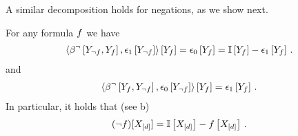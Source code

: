 A similar decomposition holds for negations, as we show next.

\begin{theorem}
    For any formula $f$ we have
    \begin{align*}
        \left\langle 
            \beta^{\lnot}\left[Y_{\lnot f},Y_{f}\right],\epsilon_{1}\left[Y_{\lnot f}\right]
        \right\rangle \left[ Y_{f} \right]
        = \epsilon_{0}\left[Y_{f}\right] =  \mathbb{I}\left[Y_{f}\right] - \epsilon_{1}\left[Y_{f}\right] \, .
    \end{align*}
    and
    \begin{align*}
        \left\langle 
            \beta^{\lnot}\left[Y_{f},Y_{\lnot f}\right],\epsilon_{0}\left[Y_{\lnot f}\right]
        \right\rangle \left[ Y_{f} \right]
        = \epsilon_{1}\left[Y_{f}\right] \, .
    \end{align*}
    In particular, it holds that (see b)
    \begin{align*}
    (\lnot f)[X_{[d]}]
        = \mathbb{I}\left[X_{[d]}\right] - f\left[X_{[d]}\right]  \, .
    \end{align*}
\end{theorem}
